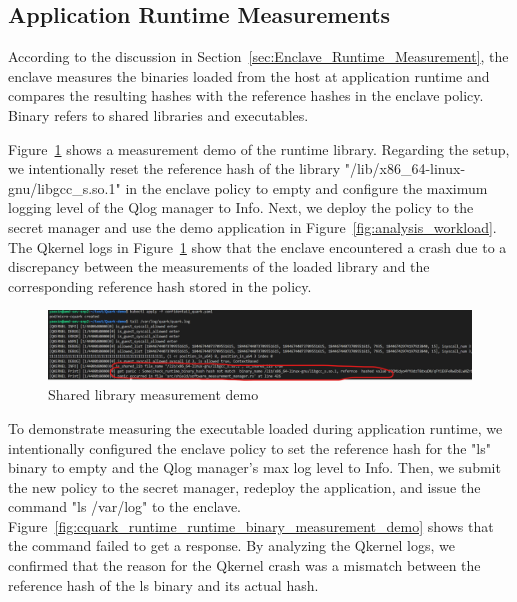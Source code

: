 \subsection{Application Runtime Measurements}




According to the discussion in Section~\ref{sec:Enclave_Runtime_Measurement}, the enclave measures the binaries loaded from the host at application runtime and compares the resulting hashes with the reference hashes in the enclave policy. Binary refers to shared libraries and executables. 

Figure~\ref{fig:cquark_runtime_runtime_lib_measurement_demo} shows a measurement demo of the runtime library. Regarding the setup, we intentionally reset the reference hash of the library "/lib/x86\_64-linux-gnu/libgcc\_s.so.1" in the enclave policy to empty and configure the maximum logging level of the Qlog manager to Info. Next, 
we deploy the policy to the secret manager and use the demo application in Figure~\ref{fig:analysis_workload}. The Qkernel logs in Figure~\ref{fig:cquark_runtime_runtime_lib_measurement_demo} show that the enclave encountered a crash due to a discrepancy between the measurements of the loaded library and the corresponding reference hash stored in the policy.


\begin{figure}[!htb]
    \centering
    \includegraphics[width=1\textwidth]{images/cquark_runtime_runtime_lib_measurement_demo.png}
    \caption[Shared library measurement demo]{Shared library measurement demo}
    \label{fig:cquark_runtime_runtime_lib_measurement_demo}
\end{figure}




To demonstrate measuring the executable loaded during application runtime, we intentionally configured the enclave policy to set the reference hash for the "ls" binary to empty and the Qlog manager's max log level to Info. Then, we submit the new policy to the secret manager,  
redeploy the application, and issue the command "ls /var/log" to the enclave. Figure~\ref{fig:cquark_runtime_runtime_binary_measurement_demo}  shows that the command failed to get a response. By analyzing the Qkernel logs, we confirmed that the reason for the Qkernel crash was a mismatch between the reference hash of the ls binary and its actual hash.



